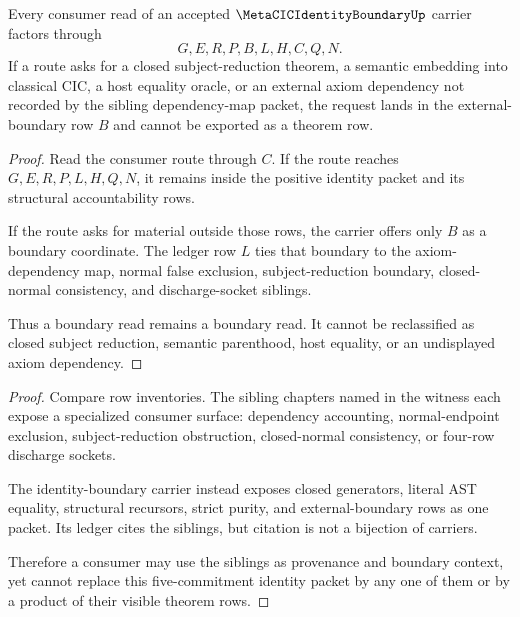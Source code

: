 \begin{theorem}
\label{thm:metacic-identity-boundary-ledger-nonescape}
Every consumer read of an accepted $\MetaCICIdentityBoundaryUp$ carrier factors through
$$
G,E,R,P,B,L,H,C,Q,N.
$$
If a route asks for a closed subject-reduction theorem, a semantic embedding into classical CIC, a host equality oracle, or an external axiom dependency not recorded by the sibling dependency-map packet, the request lands in the external-boundary row $B$ and cannot be exported as a theorem row.
\end{theorem}
\begin{proof}
Read the consumer route through $C$. If the route reaches $G,E,R,P,L,H,Q,N$, it remains inside the positive identity packet and its structural accountability rows.

If the route asks for material outside those rows, the carrier offers only $B$ as a boundary coordinate. The ledger row $L$ ties that boundary to the axiom-dependency map, normal false exclusion, subject-reduction boundary, closed-normal consistency, and discharge-socket siblings.

Thus a boundary read remains a boundary read. It cannot be reclassified as closed subject reduction, semantic parenthood, host equality, or an undisplayed axiom dependency.
\end{proof}

\begin{theorem}
\label{thm:metacic-identity-boundary-sibling-independence}
\end{theorem}
\begin{proof}
Compare row inventories. The sibling chapters named in the witness each expose a specialized consumer surface: dependency accounting, normal-endpoint exclusion, subject-reduction obstruction, closed-normal consistency, or four-row discharge sockets.

The identity-boundary carrier instead exposes closed generators, literal AST equality, structural recursors, strict purity, and external-boundary rows as one packet. Its ledger cites the siblings, but citation is not a bijection of carriers.

Therefore a consumer may use the siblings as provenance and boundary context, yet cannot replace this five-commitment identity packet by any one of them or by a product of their visible theorem rows.
\end{proof}


